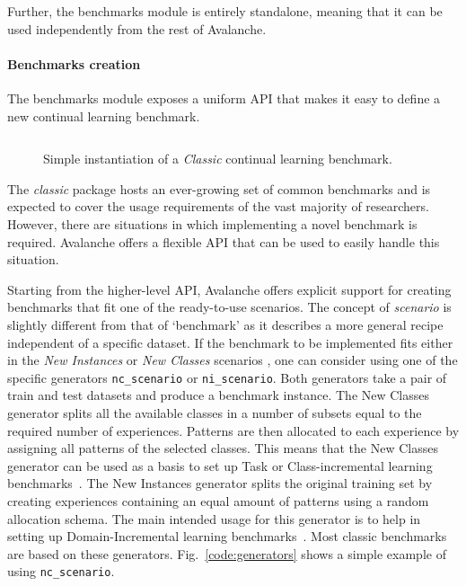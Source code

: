 \documentclass[final]{cvpr}
\theoremstyle{definition}
\newcommand{\codeinline}[1]{\texttt{#1}}
\begin{document}
Further, the benchmarks module is entirely standalone, meaning that it can be used independently from the rest of Avalanche.

\paragraph{Benchmarks creation}

The benchmarks module exposes a uniform API that makes it easy to define a new continual learning benchmark.

\begin{figure}
\begin{tcolorbox}[title={Classic Benchmarks}, colback=mygray]
\inputminted{python}{scenario_creation.py}
\end{tcolorbox}
\caption{Simple instantiation of a \emph{Classic} continual learning benchmark.}
\label{code:classic-benchmarks}
\end{figure}

The \emph{classic} package hosts an ever-growing set of common benchmarks and is expected to cover the usage requirements of the vast majority of researchers. However, there are situations in which implementing a novel benchmark is required. Avalanche offers a flexible API that can be used to easily handle this situation.

Starting from the higher-level API, Avalanche offers explicit support for creating benchmarks that fit one of the ready-to-use scenarios. The concept of \emph{scenario} is slightly different from that of `benchmark' as it describes a more general recipe independent of a specific dataset.
If the benchmark to be implemented fits either in the \textit{New Instances} or \textit{New Classes} scenarios \cite{maltoni2019}, one can consider using one of the specific generators \codeinline{nc\_scenario} or \codeinline{ni\_scenario}. Both generators take a pair of train and test datasets and produce a benchmark instance. The New Classes generator splits all the available classes in a number of subsets equal to the required number of experiences. Patterns are then allocated to each experience by assigning all patterns of the selected classes. This means that the New Classes generator can be used as a basis to set up Task or Class-incremental learning benchmarks~\cite{vandeven2018a}. The New Instances generator splits the original training set by creating experiences containing an equal amount of patterns using a random allocation schema. The main intended usage for this generator is to help in setting up Domain-Incremental learning benchmarks~\cite{vandeven2018a}. Most classic benchmarks are based on these generators. Fig.~\ref{code:generators} shows a simple example of using \codeinline{nc\_scenario}.
\end{document}
